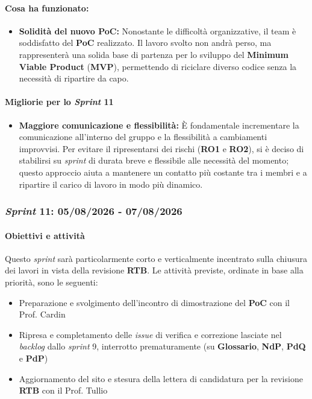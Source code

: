\documentclass[12pt, a4paper]{article}
\begin{document}
{\paragraph{Cosa ha funzionato:}
\begin{itemize}
    \item \textbf{Solidità del nuovo PoC:} Nonostante le difficoltà organizzative, il team è  soddisfatto del \textbf{PoC} realizzato. Il lavoro svolto non andrà perso, ma rappresenterà una solida base di partenza per lo sviluppo del \textbf{Minimum Viable Product} (\textbf{MVP}), permettendo di riciclare diverso codice senza la necessità di ripartire da capo.
\end{itemize}

\paragraph{Migliorie per lo \textit{Sprint} 11}
\begin{itemize}
    \item \textbf{Maggiore comunicazione e flessibilità:} È fondamentale incrementare la comunicazione all'interno del gruppo e la flessibilità a cambiamenti improvvisi. Per evitare il ripresentarsi dei rischi (\textbf{RO1} e \textbf{RO2}), si è deciso di stabilirsi su \textit{sprint} di durata breve e flessibile alle necessità del momento; questo approccio aiuta a mantenere un contatto più costante tra i membri e a ripartire il carico di lavoro in modo più dinamico.
\end{itemize}


\subsubsection{\textit{Sprint} 11: 05/08/2026 - 07/08/2026}

\paragraph{Obiettivi e attività}

Questo \textit{sprint} sarà particolarmente corto e verticalmente incentrato sulla chiusura dei lavori in vista della revisione \textbf{RTB}. Le attività previste, ordinate in base alla priorità, sono le seguenti:

\begin{itemize}
    \item Preparazione e svolgimento dell'incontro di dimostrazione del \textbf{PoC} con il Prof. Cardin
    \item Ripresa e completamento delle \textit{issue} di verifica e correzione lasciate nel \textit{backlog} dallo \textit{sprint} 9, interrotto prematuramente (su \textbf{Glossario}, \textbf{NdP}, \textbf{PdQ} e \textbf{PdP})
    \item Aggiornamento del sito e stesura della lettera di candidatura per la revisione \textbf{RTB} con il Prof. Tullio
\end{itemize}

}
\end{document}
